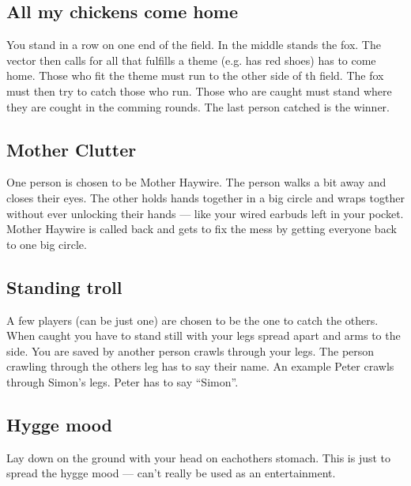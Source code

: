 \documentclass[../../../main.tex]{subfiles}
\begin{document}
\begin{multicols}{2}
\subsection*{All my chickens come home}
    You stand in a row on one end of the field. In the middle stands the fox. The vector then calls for all that fulfills a theme (e.g. has red shoes) has to come home. Those who fit the theme must run to the other side of th field. The fox must then try to catch those who run. Those who are caught must stand where they are cought in the comming rounds. The last person catched is the winner.

\subsection*{Mother Clutter}
    One person is chosen to be Mother Haywire. The person walks a bit away and closes their eyes. The other holds hands together in a big circle and wraps togther without ever unlocking their hands --- like your wired earbuds left in your pocket. Mother Haywire is called back and gets to fix the mess by getting everyone back to one big circle.

\subsection*{Standing troll}
    A few players (can be just one) are chosen to be the one to catch the others. When caught you have to stand still with your legs spread apart and arms to the side. You are saved by another person crawls through your legs. The person crawling through the others leg has to say their name. An example Peter crawls through Simon's legs. Peter has to say ``Simon''.

\subsection*{Hygge mood}
    Lay down on the ground with your head on eachothers stomach. This is just to spread the hygge mood --- can't really be used as an entertainment.


\end{multicols}
\end{document}
